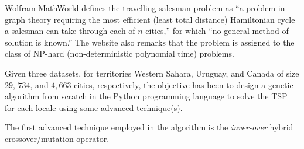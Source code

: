 Wolfram MathWorld defines the travelling salesman problem as ``a problem 
in graph theory requiring the most efficient (\ie least total distance) 
Hamiltonian cycle a salesman can take through each of $n$ cities,'' for which
``no general method of solution is known.'' \cite{tsp_wolfram_alpha} The 
website also remarks that the problem is assigned to the class of NP-hard 
(non-deterministic polynomial time) problems.

Given three datasets, for territories Western Sahara, Uruguay, and Canada of 
size $29$, $734$, and $4,663$ cities, respectively, the objective has been 
to design a genetic algorithm from scratch in the Python programming language
to solve the TSP for each locale using some advanced technique(s).

The first advanced technique employed in the algorithm is the {\em inver-over}
hybrid crossover/mutation operator. 




